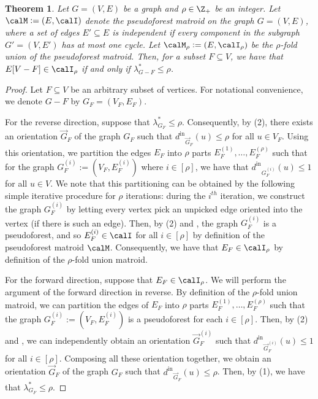 \documentclass{article}
\newtheorem{theorem}{Theorem}[section]
\newcommand{\indegree}{\ensuremath{d^{\text{in}}}\xspace}
\begin{document}
\begin{theorem}\label{thm:dds-to-matroidfvs}
    Let $G = (V, E)$ be a graph and $\rho \in \Z_+$ be an integer. 
    Let $\calM := (E, \calI)$ denote the pseudoforest matroid on the graph $G = (V, E)$, where a set of edges $E'\subseteq E$ is independent if every component in the subgraph $G' = (V, E')$ has at most one cycle. Let $\calM_{\rho} := (E, \calI_\rho)$ be the $\rho$-fold union of the pseudoforest matroid. 
    Then, for a subset $F \subseteq V$, we have that $E[V - F] \in \calI_\rho$ if and only if $\lambda^*_{G - F} \leq \rho$.
\end{theorem}
\begin{proof}
Let $F \subseteq V$ be an arbitrary subset of vertices. For notational convenience, we denote $G-F$ by $G_F = (V_F, E_F)$.

For the reverse direction, suppose that $\lambda^*_{G_F} \leq \rho$. Consequently, by (2), there exists an orientation $\vec{G}_F$ of the graph $G_F$ such that $\indegree_{\vec{G}_F}(u) \leq \rho$ for all $u \in V_F$. Using this orientation, we partition the edges $E_F$ into $\rho$ parts $E_F^{(1)}, \ldots, E_F^{(\rho)}$ such that for the graph $G_F^{(i)} := (V_F, E_F^{(i)})$ where $i \in [\rho]$, we have that $\indegree_{G_F^{(i)}}(u) \leq 1$ for all $u \in V$. We note that this partitioning can be obtained by the following simple iterative procedure for $\rho$ iterations: during the $i^{th}$ iteration, we construct the graph $G_F^{(i)}$ by letting every vertex pick an unpicked edge oriented into the vertex (if there is such an edge).  Then, by (2) and , the graph $G_F^{(i)}$ is a pseudoforest, and so $E_F^{(i)} \in \calI$ for all $i \in [\rho]$ by definition of the pseudoforest matroid $\calM$. Consequently, we have that $E_F \in \calI_\rho$ by definition of the $\rho$-fold union matroid.

For the forward direction, suppose that $E_F \in \calI_\rho$. We will perform the argument of the forward direction in reverse. By definition of the $\rho$-fold union matroid, we can partition the edges of $E_F$ into $\rho$ parts $E_F^{(1)}, \ldots, E_F^{(\rho)}$ such that the graph $G_F^{(i)} := (V_F, E_F^{(i)})$ is a pseudoforest for each $i \in [\rho]$. Then, by (2) and , we can independently obtain an orientation $\vec{G}_F^{(i)}$ such that $\indegree_{\vec{G}_F^{(i)}}(u) \leq 1$ for all $i \in [\rho]$. Composing all these orientation together, we obtain an orientation $\vec{G}_F$ of the graph $G_F$ such that $\indegree_{\vec{G}_F}(u) \leq \rho$. Then, by (1), we have that $\lambda^*_{G_F} \leq \rho$.
\end{proof}
\end{document}
